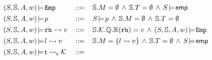 \begin{figure*}[!t]
    \centering
    \vspace{-0.8em}
    \[
        \begin{array}{lcl}
            \asrtmodel{(\state, \hpstate, \primcom, \word)}
            {\empAst} & \define &
            \hpstate.\Mem = \emptyset \, \land \,
            \hpstate.\thrdpool = \emptyset \, \land \,
            \asrtmodel{\state}{\aemp} \\
            \\[-8pt]
            \asrtmodel{(\state, \hpstate, \primcom, \word)}{\astP}
            & \, \define \, &
            \asrtmodel{\state}{\astP} \, \land \,
            \hpstate.\Mem = \emptyset \, \land \,
            \hpstate.\thrdpool = \emptyset  \\
            \\[-8pt]
            \asrtmodel{(\state, \hpstate, \primcom, \word)}
                {\hregsto{\hrn}{\val}} & \define &
                \hpstate.\hthrdlocalst.\hRstate.\hRfile(\hrn)
                = \val \, \land \,
                \asrtmodel{(\state, \hpstate, \primcom, \word)}{\empAst}
            \\
            \\[-8pt]
            \asrtmodel{(\state, \hpstate, \primcom, \word)}
                {\hmsto{\loc}{\val}} & \define &
                \hpstate.\Mem = \{ \loc \rightsquigarrow \val \}
                \, \land \,
                \hpstate.\thrdpool = \emptyset \, \land \,
                \asrtmodel{\state}{\aemp} \\
            \\[-8pt]
            \asrtmodel{(\state, \hpstate, \primcom, \word)}
                {\astCurCont{\thrdid}{\hthrdlocalst}}
                & \define &

\end{array}\]
\end{figure*}
